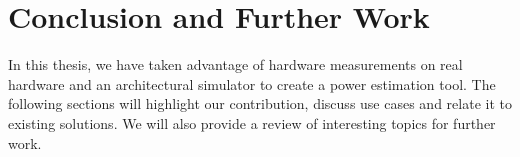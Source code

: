 \chapter{Conclusion and Further Work}

In this thesis, we have taken advantage of hardware measurements on real
hardware and an architectural simulator to create a power estimation tool. The
following sections will highlight our contribution, discuss use cases and relate
it to existing solutions. We will also provide a review of interesting topics
for further work.



